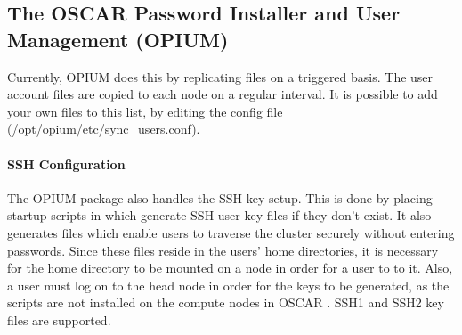 %
%
%

\subsection{The OSCAR Password Installer and User Management (OPIUM)}
\label{app:opium-overview}

Currently, OPIUM does this by replicating files on a triggered basis.
The user account files are copied to each node on a regular interval.
It is possible to add your own files to this list, by editing the
config file \cmd(/opt/opium/etc/sync_users.conf).

\paragraph{SSH Configuration}

The OPIUM package also handles the SSH key setup.  This is done by
placing startup scripts in  which generate SSH
user key files if they don't exist.  It also generates
 files which enable users to traverse the
cluster securely without entering passwords.  Since these files reside
in the users' home directories, it is necessary for the home directory
to be mounted on a node in order for a user to  to it.  Also,
a user must log on to the head node in order for the keys to be
generated, as the  scripts are not installed on
the compute nodes in OSCAR \oscarversion.  SSH1 and SSH2 key files are
supported.

